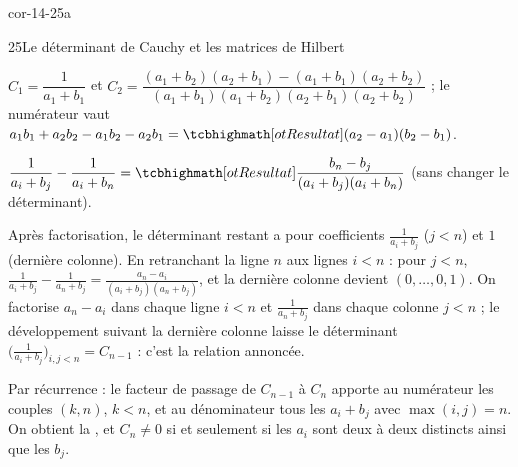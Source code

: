 
\begin{blocLivre}{cor-14-25a}
\begin{corrige}{25}{Le déterminant de Cauchy et les matrices de Hilbert}
\begin{questions}
  \item $C_1=\dfrac{1}{a_1+b_1}$ et
    $C_2=\dfrac{(a_1+b_2)(a_2+b_1)-(a_1+b_1)(a_2+b_2)}{(a_1+b_1)(a_1+b_2)(a_2+b_1)(a_2+b_2)}$ ;
    le numérateur vaut $a_1b_1+a_2b_2-a_1b_2-a_2b_1=\res{(a_2-a_1)(b_2-b_1)}$.
\end{questions}
\begin{questions}[resume]
  \item $\dfrac{1}{a_i+b_j}-\dfrac{1}{a_i+b_n}
    =\res{\dfrac{b_n-b_j}{(a_i+b_j)(a_i+b_n)}}$ (sans changer le
    déterminant).
  \item Après factorisation, le déterminant restant a pour coefficients
    $\frac{1}{a_i+b_j}$ ($j<n$) et $1$ (dernière colonne). En retranchant la
    ligne $n$ aux lignes $i<n$ : pour $j<n$,
    $\frac{1}{a_i+b_j}-\frac{1}{a_n+b_j}=\frac{a_n-a_i}{(a_i+b_j)(a_n+b_j)}$,
    et la dernière colonne devient $(0,\dots,0,1)$. On factorise $a_n-a_i$
    dans chaque ligne $i<n$ et $\frac{1}{a_n+b_j}$ dans chaque colonne
    $j<n$ ; le développement suivant la dernière colonne laisse le
    déterminant $\bigl(\frac{1}{a_i+b_j}\bigr)_{i,j<n}=C_{n-1}$ : c'est la
    relation annoncée.
  \item Par récurrence : le facteur de passage de $C_{n-1}$ à $C_n$ apporte
    au numérateur les couples $(k,n)$, $k<n$, et au dénominateur tous les
    $a_i+b_j$ avec $\max(i,j)=n$. On obtient la , et $C_n\neq0$ si et seulement si les $a_i$ sont deux à deux
    distincts ainsi que les $b_j$.
\end{questions}
\end{corrige}
\end{blocLivre}


